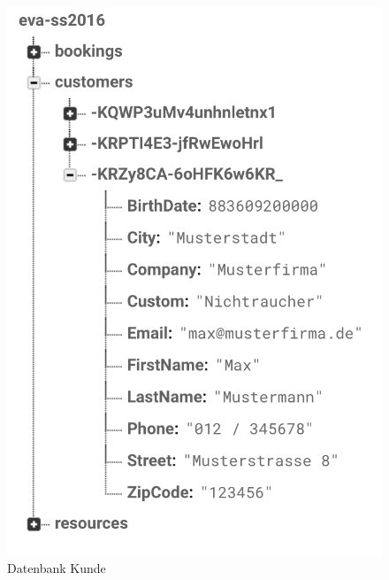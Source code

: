 \begin{figure}[H]
\begin{minipage}[t]{0.32\linewidth}
        \includegraphics[width=\linewidth]{images/backend_database_customers.png}
        \caption{Datenbank Kunde}
        \label{backend_database_customers}
    \end{minipage}
    \hfill
    \begin{minipage}[t]{0.32\linewidth}
        \centering

\end{minipage}
\end{figure}
